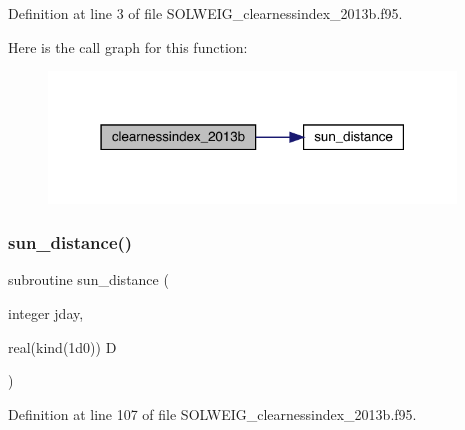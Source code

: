 Definition at line 3 of file S\+O\+L\+W\+E\+I\+G\+\_\+clearnessindex\+\_\+2013b.\+f95.

Here is the call graph for this function\+:\nopagebreak
\begin{figure}[H]
\begin{center}
\leavevmode
\includegraphics[width=307pt]{_s_o_l_w_e_i_g__clearnessindex__2013b_8f95_a258ef96aee5783c494f7167ead080555_cgraph}
\end{center}
\end{figure}
\mbox{\label{_s_o_l_w_e_i_g__clearnessindex__2013b_8f95_a75e96c888db31101f20ca8790e5e9c13}} 
\subsubsection{\texorpdfstring{sun\+\_\+distance()}{sun\_distance()}}
{\footnotesize\ttfamily subroutine sun\+\_\+distance (\begin{DoxyParamCaption}\item[{integer}]{jday,  }\item[{real(kind(1d0))}]{D }\end{DoxyParamCaption})}



Definition at line 107 of file S\+O\+L\+W\+E\+I\+G\+\_\+clearnessindex\+\_\+2013b.\+f95.

